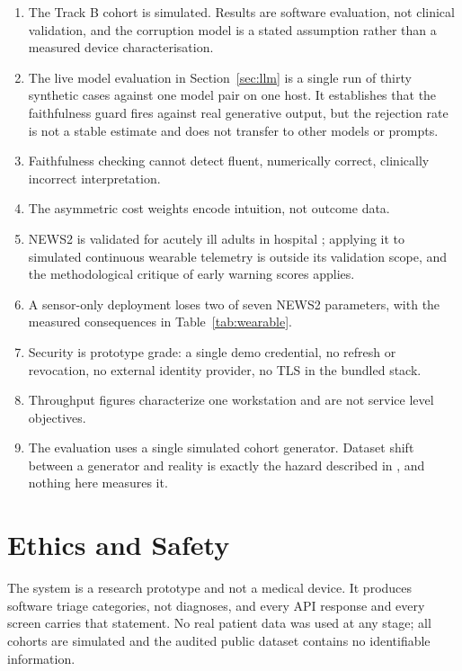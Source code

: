 \documentclass[lettersize,journal]{IEEEtran}
\begin{document}
\begin{enumerate}
  \item The Track B cohort is simulated. Results are software evaluation, not
        clinical validation, and the corruption model is a stated assumption
        rather than a measured device characterisation.
  \item The live model evaluation in Section~\ref{sec:llm} is a single run
        of thirty synthetic cases against one model pair on one host. It
        establishes that the faithfulness guard fires against real
        generative output, but the rejection rate is not a stable estimate
        and does not transfer to other models or prompts.
  \item Faithfulness checking cannot detect fluent, numerically correct,
        clinically incorrect interpretation.
  \item The asymmetric cost weights encode intuition, not outcome data.
  \item NEWS2 is validated for acutely ill adults in hospital
        \cite{smith2013, rcp2017}; applying it to simulated continuous wearable
        telemetry is outside its validation scope, and the methodological
        critique of early warning scores \cite{gerry2020} applies.
  \item A sensor-only deployment loses two of seven NEWS2 parameters, with the
        measured consequences in Table~\ref{tab:wearable}.
  \item Security is prototype grade: a single demo credential, no refresh or
        revocation, no external identity provider, no TLS in the bundled stack.
  \item Throughput figures characterize one workstation and are not service
        level objectives.
  \item The evaluation uses a single simulated cohort generator. Dataset shift
        between a generator and reality is exactly the hazard described in
        \cite{finlayson2021}, and nothing here measures it.
\end{enumerate}

\section{Ethics and Safety}

The system is a research prototype and not a medical device. It produces
software triage categories, not diagnoses, and every API response and every
screen carries that statement. No real patient data was used at any stage; all
cohorts are simulated and the audited public dataset contains no identifiable
information.
\end{document}
